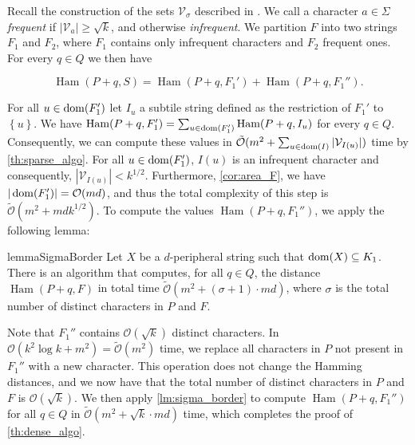 \documentclass[11pt, letterpaper]{article}
\theoremstyle{plain}
\theoremstyle{definition}
\theoremstyle{remark}
\renewcommand{\O}{\mathcal{O}}
\newcommand{\tO}{\tilde{\mathcal{O}}}
\newcommand{\V}{\mathcal{V}}
\newcommand{\set}[1]{\left\lbrace #1 \right\rbrace}
\DeclareMathOperator*{\Ham}{Ham}
\begin{document}
Recall the construction of the sets $\V_\sigma$ described in . We call a character $a \in \Sigma$ \emph{frequent} if $|\V_a| \ge \sqrt{k}$, and otherwise \emph{infrequent}. We partition $F$ into two strings $F_1$ and $F_2$, where $F_1$ contains only infrequent characters and $F_2$ frequent ones. For every $q \in Q$ we then have 

\[\Ham(P + q, S) = \Ham(P + q, F_1') + \Ham(P + q, F_1'').\]

For all $u \in \operatorname*{dom}(F_1')$ let $I_u$ a subtile string defined as the restriction of $F_1'$ to $\set{u}$. We have $\Ham(P + q, F_1') = \sum_{u \in \d{F_1'}} \Ham(P + q, I_u)$ for every $q \in Q$. Consequently, we can compute these values in $\tO(m^2 + \sum_{u \in \d{I}} |\V_{I(u)}|)$ time by \cref{th:sparse_algo}. For all $u \in \operatorname*{dom}(F_1')$, $I(u)$ is an infrequent character and consequently, $|\V_{I(u)}| < k^{1/2}$. Furthermore, \cref{cor:area_F}, we have $|\d{F_1'}| = \O(md)$, and thus the total complexity of this step is $\tO(m^2 + mdk^{1/2})$. 
To compute the values $\Ham(P + q, F_1'')$, we apply the following lemma:

\begin{restatable}{lemma}{SigmaBorder}\label{lm:sigma_border}
Let $X$ be a $d$-peripheral string such that $\operatorname*{dom}(X) \subseteq K_1$. There is an algorithm that computes, for all $q \in Q$, the distance $\Ham(P + q, F)$ in total time $\tO(m^2 + (\sigma+1) \cdot md)$, where $\sigma$ is the total number of distinct characters in $P$ and $F$.
\end{restatable}

Note that $F_1''$ contains $\O(\sqrt{k})$ distinct characters. In $\O(k^2 \log k + m^2) = \tO(m^2)$ time, we replace all characters in $P$ not present in $F_1''$ with a new character. This operation does not change the Hamming distances, and we now have that the total number of distinct characters in $P$ and $F$ is $\O(\sqrt{k})$. We then apply \cref{lm:sigma_border} to compute $\Ham(P + q, F_1'')$ for all $q \in Q$ in $\tO(m^2 + \sqrt k \cdot md)$ time, which completes the proof of \ref{th:dense_algo}. 
\end{document}
